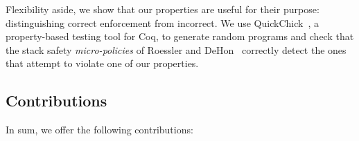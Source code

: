 \documentclass[10pt,conference]{ieeetran}%
\theoremstyle{definition}
\begin{document}

Flexibility aside, we show that our properties are useful for their purpose:
distinguishing correct enforcement from incorrect. We use
QuickChick~\cite{Denes:VSL2014,Pierce:SF4}, a property-based testing
tool for Coq, to generate random programs and check that the
stack safety {\em micro-policies} of Roessler and DeHon~\cite{DBLP:conf/sp/RoesslerD18}
correctly detect the ones that attempt to violate one of our properties.


\subsection{Contributions}

In sum, we offer the following contributions:
\end{document}
